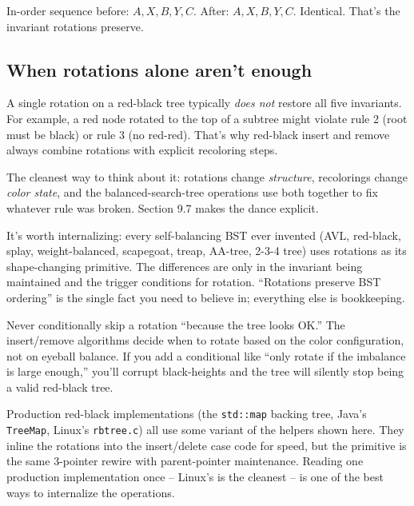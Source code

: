 \documentclass[11pt]{article}
\begin{document}
In-order sequence before: $A, X, B, Y, C$. After: $A, X, B, Y, C$. Identical. That's the invariant rotations preserve.

\subsection*{When rotations alone aren't enough}

A single rotation on a red-black tree typically \emph{does not} restore all five invariants. For example, a red node rotated to the top of a subtree might violate rule 2 (root must be black) or rule 3 (no red-red). That's why red-black insert and remove always combine rotations with explicit recoloring steps.

The cleanest way to think about it: rotations change \emph{structure}, recolorings change \emph{color state}, and the balanced-search-tree operations use both together to fix whatever rule was broken. Section 9.7 makes the dance explicit.

\begin{ideabox}
It's worth internalizing: every self-balancing BST ever invented (AVL, red-black, splay, weight-balanced, scapegoat, treap, AA-tree, 2-3-4 tree) uses rotations as its shape-changing primitive. The differences are only in the invariant being maintained and the trigger conditions for rotation. ``Rotations preserve BST ordering'' is the single fact you need to believe in; everything else is bookkeeping.
\end{ideabox}

\begin{warnbox}
Never conditionally skip a rotation ``because the tree looks OK.'' The insert/remove algorithms decide when to rotate based on the color configuration, not on eyeball balance. If you add a conditional like ``only rotate if the imbalance is large enough,'' you'll corrupt black-heights and the tree will silently stop being a valid red-black tree.
\end{warnbox}

\begin{notebox}
Production red-black implementations (the \texttt{std::map} backing tree, Java's \texttt{TreeMap}, Linux's \texttt{rbtree.c}) all use some variant of the helpers shown here. They inline the rotations into the insert/delete case code for speed, but the primitive is the same 3-pointer rewire with parent-pointer maintenance. Reading one production implementation once -- Linux's is the cleanest -- is one of the best ways to internalize the operations.
\end{notebox}
\end{document}
